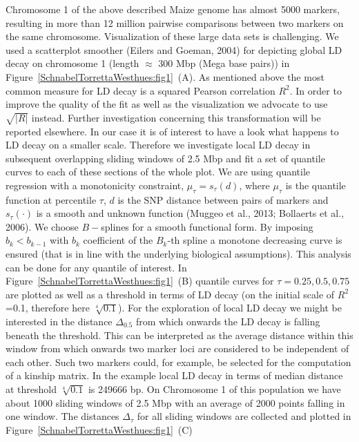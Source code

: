 \documentclass[twoside]{report}
\begin{document}
Chromosome 1 of the above described 
Maize genome has almost 5000 markers, resulting in more than 
12 million pairwise comparisons 
	between two markers on the same chromosome. Visualization of these large data sets is 
	challenging. We used a scatterplot smoother (Eilers and Goeman, 2004) for depicting
	global LD decay on chromosome 1 (length $\approx$ 300 Mbp (Mega base pairs))   
	in Figure~\ref{SchnabelTorrettaWesthues:fig1}~(A). As mentioned above the most 
	common measure for LD decay is a squared Pearson correlation $R^2$. In order to improve the 
	quality of the fit as well as the visualization we advocate to use $\sqrt{|R|}$ instead. Further 
	investigation concerning this transformation will be reported elsewhere. 
	In our case it is of interest to have a look what happens to 
	LD decay on a smaller scale. Therefore we investigate local LD decay in subsequent 
	overlapping sliding windows of 2.5 Mbp and fit a set of quantile curves to each of these 
	sections of the whole plot.  
	We are using quantile 
	regression with a monotonicity constraint,
	$\mu_{\tau}=s_{\tau}(d)$, where $\mu_\tau$ is the quantile function at 
	percentile $\tau$, $d$ is the SNP distance between pairs of markers and 
	$s_{\tau}(\cdot)$ is a smooth and unknown function (Muggeo et al., 2013; Bollaerts et al., 2006). 
	We choose $B-$splines for a smooth functional form. By imposing 
	$b_k<b_{k-1}$ with $b_{k}$ coefficient of the $B_k$-th spline 
	a monotone decreasing curve is ensured (that is 
	in line with the underlying biological assumptions). This analysis can be done for any quantile 
	of interest. In Figure~\ref{SchnabelTorrettaWesthues:fig1}~(B) quantile curves for 
	$\tau={0.25,0.5,0.75}$ are 
	plotted as well as a threshold in terms of LD decay (on the initial scale 
	of $R^2$=0.1, therefore here $\sqrt[4]{0.1}$). For the exploration of local LD decay 
	we might be interested in the distance $\Delta_{0.5}$ from 
	which onwards the LD decay is falling beneath the threshold. This can be interpreted as the
	average distance within this window from which onwards two marker loci are considered to be 
	independent of each other. Such two markers could, for example, be selected for the computation
	of a kinship matrix. In the example local 
		LD decay in terms of median distance at threshold $\sqrt[4]{0.1}$ is 249666 bp. 
	On Chromosome 1 of this population we have about 1000 sliding windows
	 of 2.5 Mbp with an 
	average of 2000 points falling in one window. The distances 
	$\Delta_{\tau}$ for all sliding windows are collected and plotted 
	in Figure~\ref{SchnabelTorrettaWesthues:fig1}~(C) 
\end{document}
